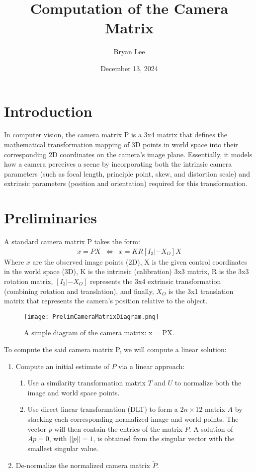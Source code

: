 \documentclass[12pt]{article}
\title{Computation of the Camera Matrix}
\author{Bryan Lee}
\date{December 13, 2024}
\begin{document}
\maketitle

\section{Introduction}
In computer vision, the camera matrix P is a 3x4 matrix that defines the mathematical transformation mapping of 3D points in world space into their corresponding 2D coordinates on the camera's image plane. Essentially, it models how a camera perceives a scene by incorporating both the intrinsic camera parameters (such as focal length, principle point, skew, and distortion scale) and extrinsic parameters (position and orientation) required for this transformation.

\section{Preliminaries}
A standard camera matrix P takes the form:
\[
	\begin{array}{rrcl}
        x = PX & \Leftrightarrow & x = KR[I_3 | -X_O]X
	\end{array}
\]
Where \( x \) are the observed image points (2D), X is the given control coordinates in the world space (3D), K is the intrinsic (calibration) 3x3 matrix, R is the 3x3 rotation matrix, \( [I_3 | -X_O] \) represents the 3x4 extrinsic transformation (combining rotation and translation), and finally, \( X_O \) is the 3x1 translation matrix that represents the camera's position relative to the object.\\

\begin{figure}[ht]
    \centering
    \texttt{[image: PrelimCameraMatrixDiagram.png]}
    \caption{A simple diagram of the camera matrix: x = PX.}
\end{figure}

\noindent To compute the said camera matrix P, we will compute a linear solution:
\begin{enumerate}
    \item Compute an initial estimate of \( P \) via a linear approach:
    \begin{enumerate}
        \item Use a similarity transformation matrix \( T \) and \( U \) to normalize both the image and world space points.
        \item Use direct linear transformation (DLT) to form a \( 2n \times 12 \) matrix \( A \) by stacking each corresponding normalized image and world points. The vector \( p \) will then contain the entries of the matrix \( \tilde{P} \). A solution of \( Ap = 0 \), with \( ||p|| = 1 \), is obtained from the singular vector with the smallest singular value.
    \end{enumerate}

    \item De-normalize the normalized camera matrix \( \tilde{P} \).
\end{enumerate}
\end{document}
